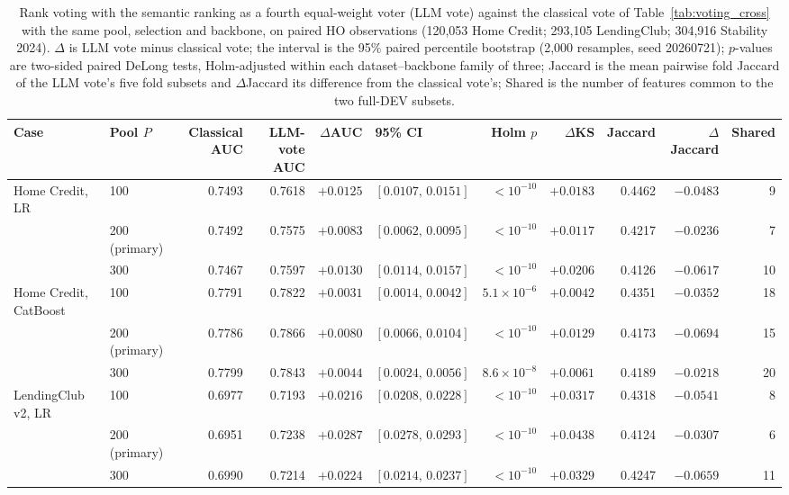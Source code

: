 \documentclass[final,5p,twocolumn]{elsarticle}
\begin{document}
\begin{table}[htbp]
\centering
\scriptsize
\setlength{\tabcolsep}{2pt}
\begin{threeparttable}
\caption{Rank voting with the semantic ranking as a fourth equal-weight voter (LLM vote) against the classical vote of Table~\ref{tab:voting_cross} with the same pool, selection and backbone, on paired HO observations (120,053 Home Credit; 293,105 LendingClub; 304,916 Stability 2024). $\Delta$ is LLM vote minus classical vote; the interval is the 95\% paired percentile bootstrap (2,000 resamples, seed 20260721); $p$-values are two-sided paired DeLong tests, Holm-adjusted within each dataset--backbone family of three; Jaccard is the mean pairwise fold Jaccard of the LLM vote's five fold subsets and $\Delta$Jaccard its difference from the classical vote's; Shared is the number of features common to the two full-DEV subsets.}
\label{tab:voting_llm}
\begin{tabular}{@{}llrrrlrrrrr@{}}
\toprule
Case & Pool $P$ & Classical AUC & LLM-vote AUC & $\Delta$AUC & 95\% CI & Holm $p$ & $\Delta$KS & Jaccard & $\Delta$Jaccard & Shared \\
\midrule
Home Credit, LR & 100 & 0.7493 & 0.7618 & $+0.0125$ & $[0.0107,\,0.0151]$ & $<10^{-10}$ & $+0.0183$ & 0.4462 & $-0.0483$ & 9 \\
 & 200 (primary) & 0.7492 & 0.7575 & $+0.0083$ & $[0.0062,\,0.0095]$ & $<10^{-10}$ & $+0.0117$ & 0.4217 & $-0.0236$ & 7 \\
 & 300 & 0.7467 & 0.7597 & $+0.0130$ & $[0.0114,\,0.0157]$ & $<10^{-10}$ & $+0.0206$ & 0.4126 & $-0.0617$ & 10 \\
\addlinespace
Home Credit, CatBoost & 100 & 0.7791 & 0.7822 & $+0.0031$ & $[0.0014,\,0.0042]$ & $5.1\times10^{-6}$ & $+0.0042$ & 0.4351 & $-0.0352$ & 18 \\
 & 200 (primary) & 0.7786 & 0.7866 & $+0.0080$ & $[0.0066,\,0.0104]$ & $<10^{-10}$ & $+0.0129$ & 0.4173 & $-0.0694$ & 15 \\
 & 300 & 0.7799 & 0.7843 & $+0.0044$ & $[0.0024,\,0.0056]$ & $8.6\times10^{-8}$ & $+0.0061$ & 0.4189 & $-0.0218$ & 20 \\
\addlinespace
LendingClub v2, LR & 100 & 0.6977 & 0.7193 & $+0.0216$ & $[0.0208,\,0.0228]$ & $<10^{-10}$ & $+0.0317$ & 0.4318 & $-0.0541$ & 8 \\
 & 200 (primary) & 0.6951 & 0.7238 & $+0.0287$ & $[0.0278,\,0.0293]$ & $<10^{-10}$ & $+0.0438$ & 0.4124 & $-0.0307$ & 6 \\
 & 300 & 0.6990 & 0.7214 & $+0.0224$ & $[0.0214,\,0.0237]$ & $<10^{-10}$ & $+0.0329$ & 0.4247 & $-0.0659$ & 11 \\

\end{tabular}
\end{threeparttable}
\end{table}
\end{document}
